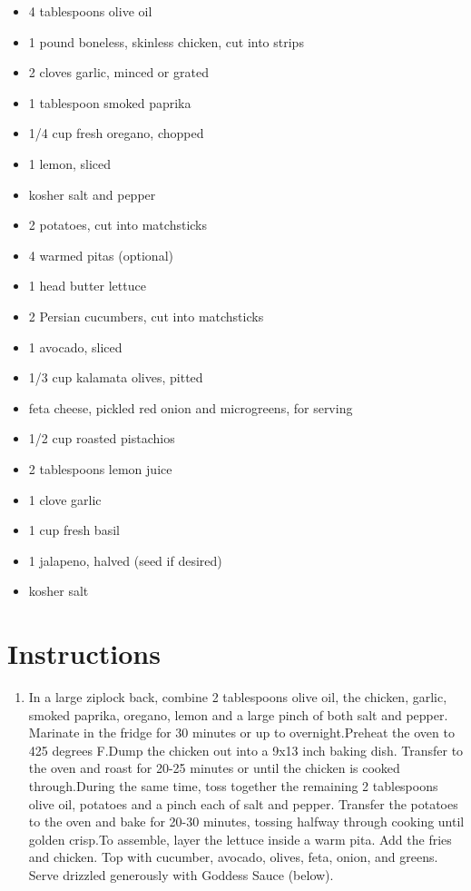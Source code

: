 \documentclass[
  letterpaper,
  DIV=11,
  numbers=noendperiod,
  titlepage=false]{scrreprt}
\providecommand{\tightlist}{%
  \setlength{\itemsep}{0pt}\setlength{\parskip}{0pt}}\usepackage{longtable,booktabs,array}
\begin{document}
\begin{itemize}
\tightlist
\item
  4 tablespoons olive oil
\item
  1 pound boneless, skinless chicken, cut into strips
\item
  2 cloves garlic, minced or grated
\item
  1 tablespoon smoked paprika
\item
  1/4 cup fresh oregano, chopped
\item
  1 lemon, sliced
\item
  kosher salt and pepper
\item
  2 potatoes, cut into matchsticks
\item
  4 warmed pitas (optional)
\item
  1 head butter lettuce
\item
  2 Persian cucumbers, cut into matchsticks
\item
  1 avocado, sliced
\item
  1/3 cup kalamata olives, pitted
\item
  feta cheese, pickled red onion and microgreens, for serving
\item
  1/2 cup roasted pistachios
\item
  2 tablespoons lemon juice
\item
  1 clove garlic
\item
  1 cup fresh basil
\item
  1 jalapeno, halved (seed if desired)
\item
  kosher salt
\end{itemize}

\section{Instructions}\label{instructions-140}

\begin{enumerate}
\def\labelenumi{\arabic{enumi}.}
\tightlist
\item
  In a large ziplock back, combine 2 tablespoons olive oil, the chicken,
  garlic, smoked paprika, oregano, lemon and a large pinch of both salt
  and pepper. Marinate in the fridge for 30 minutes or up to
  overnight.Preheat the oven to 425 degrees F.Dump the chicken out into
  a 9x13 inch baking dish. Transfer to the oven and roast for 20-25
  minutes or until the chicken is cooked through.During the same time,
  toss together the remaining 2 tablespoons olive oil, potatoes and a
  pinch each of salt and pepper. Transfer the potatoes to the oven and
  bake for 20-30 minutes, tossing halfway through cooking until golden
  crisp.To assemble, layer the lettuce inside a warm pita. Add the fries
  and chicken. Top with cucumber, avocado, olives, feta, onion, and
  greens. Serve drizzled generously with Goddess Sauce (below).
\end{enumerate}
\end{document}
